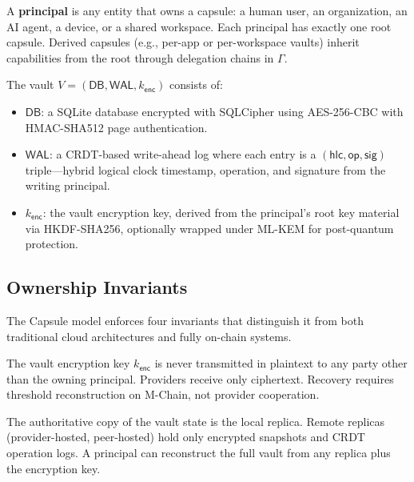 \begin{definition}[Principal]\label{def:principal}
A \textbf{principal} is any entity that owns a capsule: a human user, an
organization, an AI agent, a device, or a shared workspace. Each principal
has exactly one root capsule. Derived capsules (e.g., per-app or per-workspace
vaults) inherit capabilities from the root through delegation chains in $\Gamma$.
\end{definition}

\begin{definition}[Vault]\label{def:vault}
The vault $V = (\mathsf{DB}, \mathsf{WAL}, k_{\mathsf{enc}})$ consists of:
\begin{itemize}[nosep]
  \item $\mathsf{DB}$: a SQLite database encrypted with SQLCipher using AES-256-CBC
        with HMAC-SHA512 page authentication.
  \item $\mathsf{WAL}$: a CRDT-based write-ahead log where each entry is a
        $(\mathsf{hlc}, \mathsf{op}, \mathsf{sig})$ triple---hybrid logical clock
        timestamp, operation, and signature from the writing principal.
  \item $k_{\mathsf{enc}}$: the vault encryption key, derived from the principal's
        root key material via HKDF-SHA256, optionally wrapped under ML-KEM for
        post-quantum protection.
\end{itemize}
\end{definition}

\subsection{Ownership Invariants}

The Capsule model enforces four invariants that distinguish it from both
traditional cloud architectures and fully on-chain systems.

\begin{invariant}\label{inv:keys}
The vault encryption key $k_{\mathsf{enc}}$ is never transmitted in plaintext
to any party other than the owning principal. Providers receive only ciphertext.
Recovery requires threshold reconstruction on M-Chain, not provider cooperation.
\end{invariant}

\begin{invariant}\label{inv:locality}
The authoritative copy of the vault state is the local replica. Remote replicas
(provider-hosted, peer-hosted) hold only encrypted snapshots and CRDT operation
logs. A principal can reconstruct the full vault from any replica plus the
encryption key.
\end{invariant}


